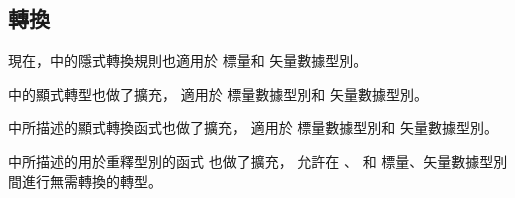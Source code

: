 \subsection{轉換}

現在，\insection[implicityConversion]中的隱式轉換規則也適用於  標量和  矢量數據型別。

\insection[explicitCast]中的顯式轉型也做了擴充，
適用於  標量數據型別和  矢量數據型別。

\insection[explicitConversion]中所描述的顯式轉換函式也做了擴充，
適用於  標量數據型別和  矢量數據型別。

\insection[as_typen]中所描述的用於重釋型別的函式  也做了擴充，
允許在 、  和  標量、矢量數據型別間進行無需轉換的轉型。
